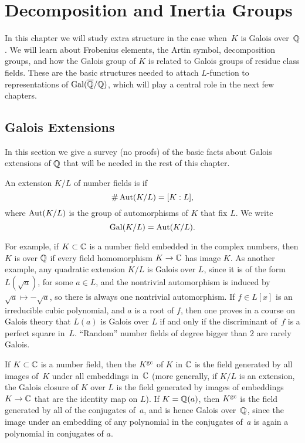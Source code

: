 \chapter{Decomposition and Inertia Groups}

In this chapter we will study extra structure in the case when~$K$
is Galois over~$\mathbb{Q}$.   We will learn about Frobenius elements,
the Artin symbol, decomposition groups, and how the Galois group of
$K$ is related to Galois groups of residue class fields.  These are
the basic structures needed to attach $L$-function to representations of
$\operatorname{Gal}(\overline{\mathbb{Q}}/\mathbb{Q})$, which will play a central role in the next few
chapters.

\section{Galois Extensions}

In this section we give a survey (no proofs) of the basic facts about
Galois extensions of $\mathbb{Q}$ that will be needed in the rest of this
chapter.
\begin{definition}[Galois]
	An extension $K/L$ of number fields is  if
	$$
		\#\operatorname{Aut}(K/L) = [K:L],
	$$
	where $\operatorname{Aut}(K/L)$ is the group of automorphisms of $K$
	that fix $L$.  We write
	$$
		\operatorname{Gal}(K/L) = \operatorname{Aut}(K/L).
	$$
\end{definition}
For example, if $K\subset \mathbb{C}$ is a number field embedded in the complex numbers,
then $K$ is  over $\mathbb{Q}$ if
every field homomorphism $K\to \mathbb{C}$ has image $K$.
As another example, any quadratic extension
$K/L$ is Galois over $L$, since it is of the form $L(\sqrt{a})$, for some $a\in
L$, and the nontrivial automorphism is induced by $\sqrt{a}\mapsto
-\sqrt{a}$, so there is always one nontrivial automorphism.  If $f\in
L[x]$ is an irreducible cubic polynomial, and $a$ is a root of $f$,
then one proves in a course on Galois theory that $L(a)$ is Galois
over $L$ if and only if the discriminant of~$f$ is a perfect square
in~$L$.  ``Random'' number fields of degree bigger than $2$ are rarely
Galois.


If $K\subset \mathbb{C}$ is a number field, then the  $K^{\operatorname{gc}}$
of $K$ in $\mathbb{C}$ is the field generated by all images of~$K$ under all
embeddings in~$\mathbb{C}$ (more generally, if $K/L$ is an extension, the
Galois closure of $K$ over $L$ is the field generated by images of
embeddings $K\to \mathbb{C}$ that are the identity map on $L$).  If $K=\mathbb{Q}(a)$,
then $K^{\operatorname{gc}}$ is the field generated by all of the conjugates of~$a$, and is
hence Galois over~$\mathbb{Q}$, since the image under an embedding of any
polynomial in the conjugates of~$a$ is again a polynomial in
conjugates of $a$.


